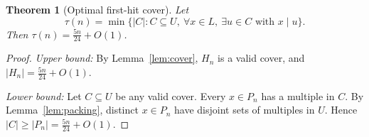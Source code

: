 \documentclass{article}
\newtheorem{theorem}{Theorem}
\begin{document}
\begin{theorem}[Optimal first-hit cover]
Let
\[\tau(n) = \min\{|C| : C \subseteq U,\ \forall x \in L,\ \exists u \in C \text{ with } x \mid u\}.\]
Then $\tau(n) = \frac{5n}{24} + O(1)$.
\end{theorem}

\begin{proof}
\emph{Upper bound:} By Lemma~\ref{lem:cover}, $H_n$ is a valid cover, and $|H_n| = \frac{5n}{24} + O(1)$.

\emph{Lower bound:} Let $C \subseteq U$ be any valid cover. Every $x \in P_n$ has a multiple in $C$. By Lemma~\ref{lem:packing}, distinct $x \in P_n$ have disjoint sets of multiples in $U$. Hence $|C| \ge |P_n| = \frac{5n}{24} + O(1)$.
\end{proof}
\end{document}
